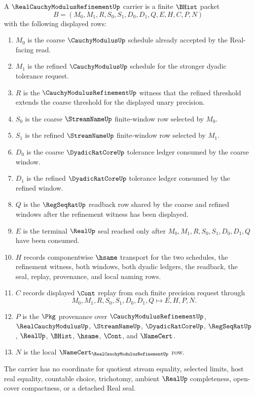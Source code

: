 \begin{definition}
\label{def:real-cauchy-modulus-refinement-carrier}
A $\RealCauchyModulusRefinementUp$ carrier is a finite $\BHist$ packet
$$
B=(M_0,M_1,R,S_0,S_1,D_0,D_1,Q,E,H,C,P,N)
$$
with the following displayed rows:
\begin{enumerate}
\item $M_0$ is the coarse $\CauchyModulusUp$ schedule already accepted by the Real-facing read.
\item $M_1$ is the refined $\CauchyModulusUp$ schedule for the stronger dyadic tolerance request.
\item $R$ is the $\CauchyModulusRefinementUp$ witness that the refined threshold extends the coarse threshold for the displayed unary precision.
\item $S_0$ is the coarse $\StreamNameUp$ finite-window row selected by $M_0$.
\item $S_1$ is the refined $\StreamNameUp$ finite-window row selected by $M_1$.
\item $D_0$ is the coarse $\DyadicRatCoreUp$ tolerance ledger consumed by the coarse window.
\item $D_1$ is the refined $\DyadicRatCoreUp$ tolerance ledger consumed by the refined window.
\item $Q$ is the $\RegSeqRatUp$ readback row shared by the coarse and refined windows after the refinement witness has been displayed.
\item $E$ is the terminal $\RealUp$ seal reached only after $M_0,M_1,R,S_0,S_1,D_0,D_1,Q$ have been consumed.
\item $H$ records componentwise $\hsame$ transport for the two schedules, the refinement witness, both windows, both dyadic ledgers, the readback, the seal, replay, provenance, and local naming rows.
\item $C$ records displayed $\Cont$ replay from each finite precision request through
$$
M_0,M_1,R,S_0,S_1,D_0,D_1,Q \longmapsto E,H,P,N .
$$
\item $P$ is the $\Pkg$ provenance over $\CauchyModulusRefinementUp$, $\RealCauchyModulusUp$, $\StreamNameUp$, $\DyadicRatCoreUp$, $\RegSeqRatUp$, $\RealUp$, $\BHist$, $\hsame$, $\Cont$, and $\NameCert$.
\item $N$ is the local $\NameCert_{\RealCauchyModulusRefinementUp}$ row.
\end{enumerate}
The carrier has no coordinate for quotient stream equality, selected limits, host real equality, countable choice, trichotomy, ambient $\RealUp$ completeness, open-cover compactness, or a detached Real seal.
\end{definition}

